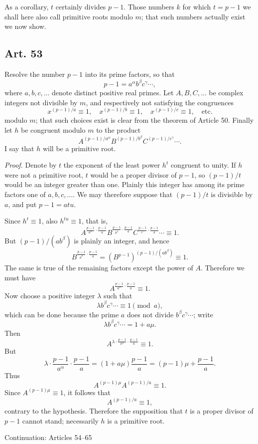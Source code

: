 \documentclass[12pt]{article}
\newcommand{\art}[1]{\subsection*{Art. #1}}
\begin{document}
As a corollary, $t$ certainly divides $p-1$. Those numbers $k$ for which $t=p-1$ we shall here also call primitive roots modulo $m$; that such numbers actually exist we now show.

\art{53}
Resolve the number $p-1$ into its prime factors, so that
\[
p-1=a^\alpha b^\beta c^\gamma\cdots,
\]
where $a,b,c,\ldots$ denote distinct positive real primes. Let $A,B,C,\ldots$ be complex integers not divisible by $m$, and respectively not satisfying the congruences
\[
x^{(p-1)/a}\equiv1,
\quad
x^{(p-1)/b}\equiv1,
\quad
x^{(p-1)/c}\equiv1,
\quad\text{etc.}
\]
modulo $m$; that such choices exist is clear from the theorem of Article 50. Finally let $h$ be congruent modulo $m$ to the product
\[
A^{(p-1)/a^\alpha}B^{(p-1)/b^\beta}C^{(p-1)/c^\gamma}\cdots.
\]
I say that $h$ will be a primitive root.

\emph{Proof.} Denote by $t$ the exponent of the least power $h^t$ congruent to unity. If $h$ were not a primitive root, $t$ would be a proper divisor of $p-1$, so $(p-1)/t$ would be an integer greater than one. Plainly this integer has among its prime factors one of $a,b,c,\ldots$. We may therefore suppose that $(p-1)/t$ is divisible by $a$, and put $p-1=atu$.

Since $h^t\equiv1$, also $h^{tu}\equiv1$, that is,
\[
A^{\frac{p-1}{a^\alpha}\cdot\frac{p-1}{a}}
B^{\frac{p-1}{b^\beta}\cdot\frac{p-1}{a}}
C^{\frac{p-1}{c^\gamma}\cdot\frac{p-1}{a}}
\cdots\equiv1.
\]
But $(p-1)/(ab^\beta)$ is plainly an integer, and hence
\[
B^{\frac{p-1}{b^\beta}\cdot\frac{p-1}{a}}
=(B^{p-1})^{(p-1)/(ab^\beta)}\equiv1.
\]
The same is true of the remaining factors except the power of $A$. Therefore we must have
\[
A^{\frac{p-1}{a^\alpha}\cdot\frac{p-1}{a}}\equiv1.
\]
Now choose a positive integer $\lambda$ such that
\[
\lambda b^\beta c^\gamma\cdots\equiv1\pmod a,
\]
which can be done because the prime $a$ does not divide $b^\beta c^\gamma\cdots$; write
\[
\lambda b^\beta c^\gamma\cdots=1+a\mu.
\]
Then
\[
A^{\lambda\cdot\frac{p-1}{a^\alpha}\cdot\frac{p-1}{a}}\equiv1.
\]
But
\[
\lambda\cdot\frac{p-1}{a^\alpha}\cdot\frac{p-1}{a}
=(1+a\mu)\frac{p-1}{a}=(p-1)\mu+\frac{p-1}{a}.
\]
Thus
\[
A^{(p-1)\mu}A^{(p-1)/a}\equiv1.
\]
Since $A^{(p-1)\mu}\equiv1$, it follows that
\[
A^{(p-1)/a}\equiv1,
\]
contrary to the hypothesis. Therefore the supposition that $t$ is a proper divisor of $p-1$ cannot stand; necessarily $h$ is a primitive root.


\bigskip
\begin{center}{\large Continuation: Articles 54--65}\end{center}
\end{document}
